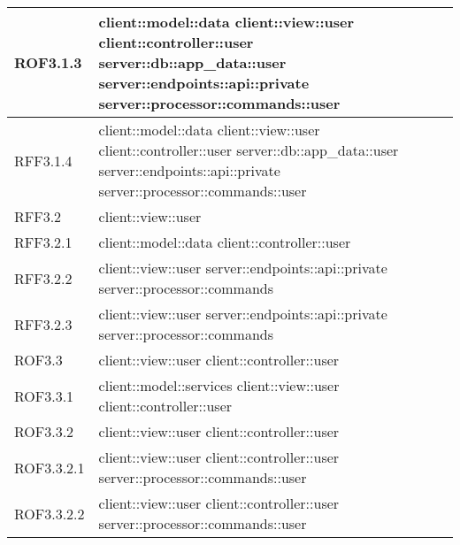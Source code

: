 \begin{center}
\begin{longtable}{| p{4cm} | p{8cm} |}
\hline
ROF3.1.3 & client::model::data \newline client::view::user \newline client::controller::user \newline server::db::app\_data::user \newline server::endpoints::api::private \newline server::processor::commands::user \\
\hline
RFF3.1.4 & client::model::data \newline client::view::user \newline client::controller::user \newline server::db::app\_data::user \newline server::endpoints::api::private \newline server::processor::commands::user \\
\hline
RFF3.2 & client::view::user \\
\hline
RFF3.2.1 & client::model::data \newline client::controller::user \\
\hline
RFF3.2.2 & client::view::user \newline server::endpoints::api::private \newline server::processor::commands \\
\hline
RFF3.2.3 & client::view::user \newline server::endpoints::api::private \newline server::processor::commands \\
\hline
ROF3.3 & client::view::user \newline client::controller::user \\
\hline
ROF3.3.1 & client::model::services \newline client::view::user \newline client::controller::user \\
\hline
ROF3.3.2 & client::view::user \newline client::controller::user \\
\hline
ROF3.3.2.1 & client::view::user \newline client::controller::user \newline server::processor::commands::user \\
\hline
ROF3.3.2.2 & client::view::user \newline client::controller::user \newline server::processor::commands::user \\

\end{longtable}
\end{center}
